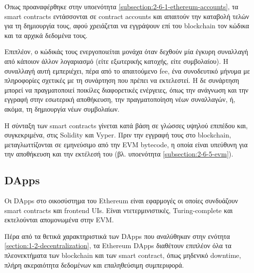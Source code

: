 Όπως προαναφέρθηκε στην υποενότητα \ref{subsection:2-6-1-ethereum-accounts}, τα smart contracts εντάσσονται σε contract accounts και απαιτούν την καταβολή τελών για τη δημιουργία τους, αφού χρειάζεται να εγγράψουν επί του blockchain τον κώδικα και τα αρχικά δεδομένα τους.

Επιπλέον, ο κώδικάς τους ενεργοποιείται μονάχα όταν δεχθούν μία έγκυρη συναλλαγή από κάποιον άλλον λογαριασμό (είτε εξωτερικής κατοχής, είτε συμβολαίου). Η συναλλαγή αυτή εμπεριέχει, πέρα από το απαιτούμενο fee, ένα συνοδευτικό μήνυμα με πληροφορίες σχετικές με τη συνάρτηση που πρέπει να εκτελεστεί. Η δε συνάρτηση μπορεί να πραγματοποιεί ποικίλες διαφορετικές ενέργειες, όπως την ανάγνωση και την εγγραφή στην εσωτερική αποθήκευση, την πραγματοποίηση νέων συναλλαγών, ή, ακόμα, τη δημιουργία νέων συμβολαίων.

Η σύνταξη των smart contracts γίνεται κατά βάση σε γλώσσες υψηλού επιπέδου και, συγκεκριμένα, στις Solidity και Vyper. Πριν την εγγραφή τους στο blockchain, μεταγλωττίζονται σε εμηνεύσιμο από την EVM bytecode, η οποία είναι υπεύθυνη για την αποθήκευση και την εκτέλεσή του (βλ. υποενότητα \ref{subsection:2-6-5-evm}).

\subsection{DApps} %
Οι DApps στο οικοσύστημα του Ethereum είναι εφαρμογές οι οποίες συνδυάζουν smart contracts και frontend UIs. Είναι ντετερμινιστικές, Turing-complete και εκτελούνται απομονωμένα στην EVM.\cite{2.6-ethereum-documentation}

Πέρα από τα θετικά χαρακτηριστικά των DApps που αναλύθηκαν στην ενότητα \ref{section:1-2-decentralization}, τα Ethereum DApps διαθέτουν επιπλέον όλα τα πλεονεκτήματα των blockchain και των smart contract, όπως μηδενικό downtime, πλήρη ακεραιότητα δεδομένων και επαληθεύσιμη συμπεριφορά.

